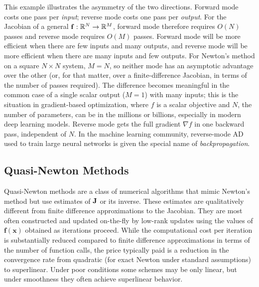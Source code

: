 This example illustrates the asymmetry of the two directions. Forward mode costs one pass per \emph{input}; reverse mode costs one pass per \emph{output}. For the Jacobian of a general $\mathbf{f}:\mathbb R^N\to\mathbb R^M$, forward mode therefore requires $O(N)$ passes and reverse mode requires $O(M)$ passes. Forward mode will be more efficient when there are few inputs and many outputs, and reverse mode will be more efficient when there are many inputs and few outputs. For Newton's method on a square $N\times N$ system, $M=N$, so neither mode has an asymptotic advantage over the other (or, for that matter, over a finite-difference Jacobian, in terms of the number of passes required). The difference becomes meaningful in the common case of a single scalar output ($M=1$) with many inputs; this is the situation in gradient-based optimization, where $f$ is a scalar objective and $N$, the number of parameters, can be in the millions or billions, especially in modern deep learning models. Reverse mode gets the full gradient $\nabla f$ in one backward pass, independent of $N$. In the machine learning community, reverse-mode AD used to train large neural networks is given the special name of \emph{backpropagation}.

\subsection{Quasi-Newton Methods}
\label{sec:quasi-newton_methods}

Quasi-Newton methods are a class of numerical algorithms that mimic Newton's method but use estimates of \(\mathbf{J}\) or its inverse. These estimates are qualitatively different from finite difference approximations to the Jacobian. They are most often constructed and updated on-the-fly by low-rank updates using the values of $\mathbf f(\mathbf x)$ obtained as iterations proceed. While the computational cost per iteration is substantially reduced compared to finite difference approximations in terms of the number of function calls, the price typically paid is a reduction in the convergence rate from quadratic (for exact Newton under standard assumptions) to superlinear. Under poor conditions some schemes may be only linear, but under smoothness they often achieve superlinear behavior.



